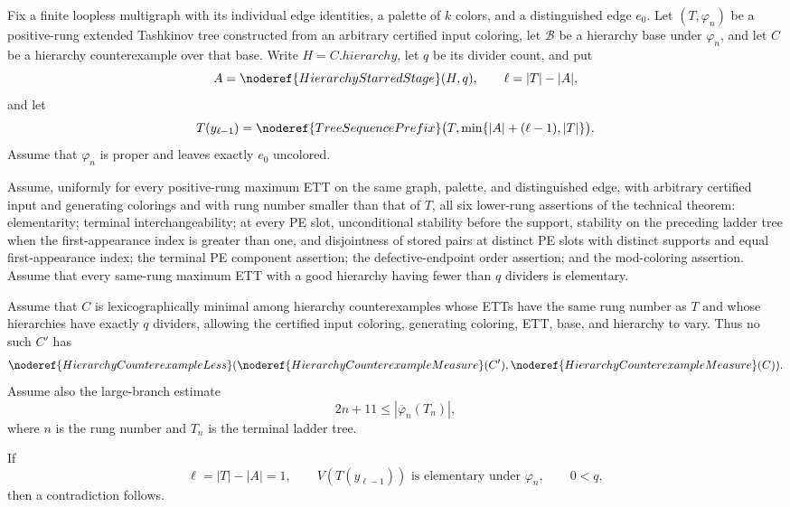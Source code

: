 \begin{lemma}
Fix a finite loopless multigraph with its individual edge identities, a
palette of $k$ colors, and a distinguished edge $e_0$.  Let
$(T,\varphi_n)$ be a positive-rung extended Tashkinov tree constructed
from an arbitrary certified input coloring, let $\mathcal B$ be a
hierarchy base under $\varphi_n$, and let $C$ be a hierarchy
counterexample over that base.  Write $H=C.\mathit{hierarchy}$, let $q$
be its divider count, and put
\[
 A=\noderef{HierarchyStarredStage}(H,q),\qquad
 \ell=|T|-|A|,
\]
and let
\[
 T(y_{\ell-1})=
 \noderef{TreeSequencePrefix}
   \bigl(T,\min\{|A|+(\ell-1),|T|\}\bigr).
\]
Assume that $\varphi_n$ is proper and leaves exactly $e_0$ uncolored.

Assume, uniformly for every positive-rung maximum ETT on the same graph,
palette, and distinguished edge, with arbitrary certified input and
generating colorings and with rung number smaller than that of $T$, all
six lower-rung assertions of the technical theorem: elementarity;
terminal interchangeability; at every PE slot, unconditional stability
before the support, stability on the preceding ladder tree when the
first-appearance index is greater than one, and disjointness of stored
pairs at distinct PE slots with distinct supports and equal
first-appearance index; the terminal PE component assertion; the
defective-endpoint order assertion; and the mod-coloring assertion.
Assume that every same-rung maximum ETT with a good hierarchy having
fewer than $q$ dividers is elementary.

Assume that $C$ is lexicographically minimal among hierarchy
counterexamples whose ETTs have the same rung number as $T$ and whose
hierarchies have exactly $q$ dividers, allowing the certified input
coloring, generating coloring, ETT, base, and hierarchy to vary.  Thus
no such $C'$ has
\[
 \noderef{HierarchyCounterexampleLess}
   (\noderef{HierarchyCounterexampleMeasure}(C'),
    \noderef{HierarchyCounterexampleMeasure}(C)).
\]
Assume also the large-branch estimate
\[
 2n+11\leq |\overline\varphi_n(T_n)|,
\]
where $n$ is the rung number and $T_n$ is the terminal ladder tree.

If
\[
 \ell=|T|-|A|=1,\qquad
 V(T(y_{\ell-1}))\text{ is elementary under }\varphi_n,
 \qquad 0<q,
\]
then a contradiction follows.
\end{lemma}
